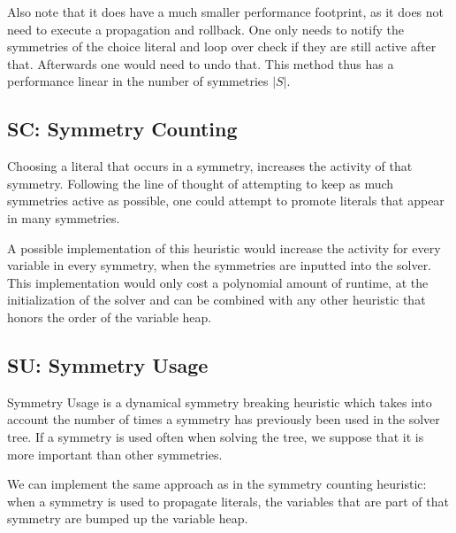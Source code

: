 	Also note that it does have a much smaller performance footprint, as it does not need to execute
	a propagation and rollback.
	One only needs to notify the symmetries of the choice literal and loop over check if they are
	still active after that.
	Afterwards one would need to undo that.
	This method thus has a performance linear in the number of symmetries $|S|$.

\subsection{SC: Symmetry Counting}

	Choosing a literal that occurs in a symmetry, increases the activity of that symmetry.
	Following the line of thought of attempting to keep as much symmetries active as possible,
	one could attempt to promote literals that appear in many symmetries.

	A possible implementation of this heuristic would increase the activity for every variable in
	every symmetry, when the symmetries are inputted into the solver.
	This implementation would only cost a polynomial amount of runtime, at the initialization of the
	solver and can be combined with any other heuristic that honors the order of the variable heap.

\subsection{SU: Symmetry Usage}
	Symmetry Usage is a dynamical symmetry breaking heuristic
	which takes into account the number of times a symmetry has previously been used in the solver tree.
	If a symmetry is used often when solving the tree, we suppose that it is more important than other symmetries.

	We can implement the same approach as in the symmetry counting heuristic: when a symmetry is
	used to propagate literals, the variables that are part of that symmetry are bumped up the
	variable heap.



